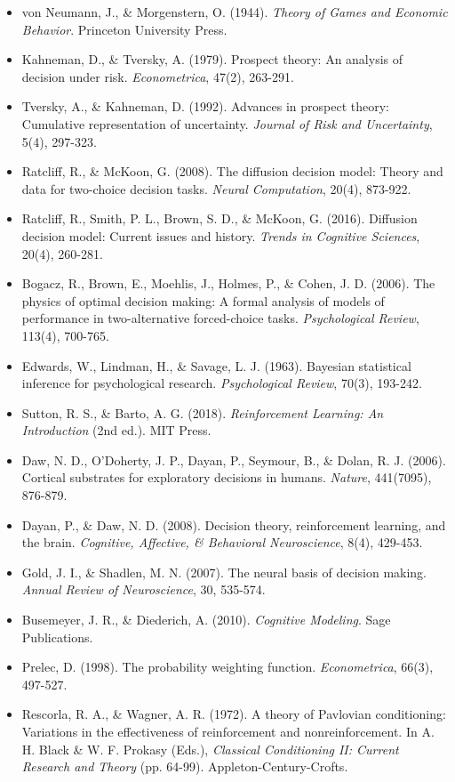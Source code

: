 \documentclass[a4paper, 11pt]{article}
\begin{document}
{{\begin{itemize}
\item von Neumann, J., \& Morgenstern, O. (1944). \textit{Theory of Games and Economic Behavior}. Princeton University Press.
\item Kahneman, D., \& Tversky, A. (1979). Prospect theory: An analysis of decision under risk. \textit{Econometrica}, 47(2), 263-291.
\item Tversky, A., \& Kahneman, D. (1992). Advances in prospect theory: Cumulative representation of uncertainty. \textit{Journal of Risk and Uncertainty}, 5(4), 297-323.
\item Ratcliff, R., \& McKoon, G. (2008). The diffusion decision model: Theory and data for two-choice decision tasks. \textit{Neural Computation}, 20(4), 873-922.
\item Ratcliff, R., Smith, P. L., Brown, S. D., \& McKoon, G. (2016). Diffusion decision model: Current issues and history. \textit{Trends in Cognitive Sciences}, 20(4), 260-281.
\item Bogacz, R., Brown, E., Moehlis, J., Holmes, P., \& Cohen, J. D. (2006). The physics of optimal decision making: A formal analysis of models of performance in two-alternative forced-choice tasks. \textit{Psychological Review}, 113(4), 700-765.
\item Edwards, W., Lindman, H., \& Savage, L. J. (1963). Bayesian statistical inference for psychological research. \textit{Psychological Review}, 70(3), 193-242.
\item Sutton, R. S., \& Barto, A. G. (2018). \textit{Reinforcement Learning: An Introduction} (2nd ed.). MIT Press.
\item Daw, N. D., O'Doherty, J. P., Dayan, P., Seymour, B., \& Dolan, R. J. (2006). Cortical substrates for exploratory decisions in humans. \textit{Nature}, 441(7095), 876-879.
\item Dayan, P., \& Daw, N. D. (2008). Decision theory, reinforcement learning, and the brain. \textit{Cognitive, Affective, \& Behavioral Neuroscience}, 8(4), 429-453.
\item Gold, J. I., \& Shadlen, M. N. (2007). The neural basis of decision making. \textit{Annual Review of Neuroscience}, 30, 535-574.
\item Busemeyer, J. R., \& Diederich, A. (2010). \textit{Cognitive Modeling}. Sage Publications.
\item Prelec, D. (1998). The probability weighting function. \textit{Econometrica}, 66(3), 497-527.
\item Rescorla, R. A., \& Wagner, A. R. (1972). A theory of Pavlovian conditioning: Variations in the effectiveness of reinforcement and nonreinforcement. In A. H. Black \& W. F. Prokasy (Eds.), \textit{Classical Conditioning II: Current Research and Theory} (pp. 64-99). Appleton-Century-Crofts.

\end{itemize}}}
\end{document}

